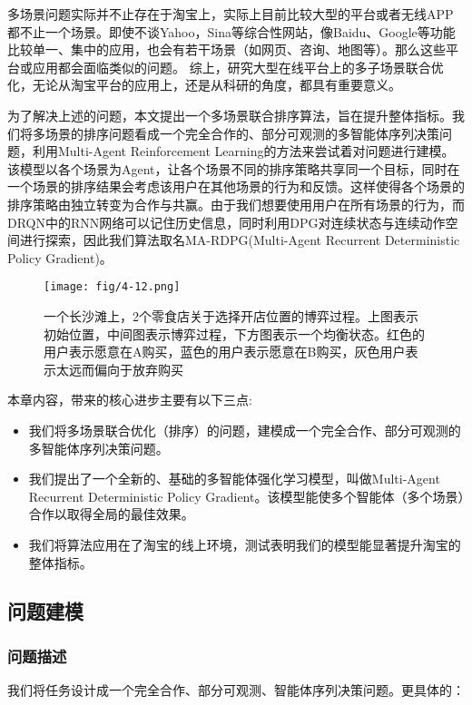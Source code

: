 多场景问题实际并不止存在于淘宝上，实际上目前比较大型的平台或者无线APP都不止一个场景。即使不谈Yahoo，Sina等综合性网站，像Baidu、Google等功能比较单一、集中的应用，也会有若干场景（如网页、咨询、地图等）。那么这些平台或应用都会面临类似的问题。
综上，研究大型在线平台上的多子场景联合优化，无论从淘宝平台的应用上，还是从科研的角度，都具有重要意义。

为了解决上述的问题，本文提出一个多场景联合排序算法，旨在提升整体指标。我们将多场景的排序问题看成一个完全合作的、部分可观测的多智能体序列决策问题，利用Multi-Agent Reinforcement Learning的方法来尝试着对问题进行建模。该模型以各个场景为Agent，让各个场景不同的排序策略共享同一个目标，同时在一个场景的排序结果会考虑该用户在其他场景的行为和反馈。这样使得各个场景的排序策略由独立转变为合作与共赢。由于我们想要使用用户在所有场景的行为，而DRQN中的RNN网络可以记住历史信息，同时利用DPG对连续状态与连续动作空间进行探索，因此我们算法取名MA-RDPG(Multi-Agent Recurrent Deterministic Policy Gradient)。

\begin{figure}[!h]
\centering
\texttt{[image: fig/4-12.png]}
\caption{ 一个长沙滩上，2个零食店关于选择开店位置的博弈过程。上图表示初始位置，中间图表示博弈过程，下方图表示一个均衡状态。红色的用户表示愿意在A购买，蓝色的用户表示愿意在B购买，灰色用户表示太远而偏向于放弃购买}
\end{figure}

本章内容，带来的核心进步主要有以下三点:
\begin{itemize}
    \item 我们将多场景联合优化（排序）的问题，建模成一个完全合作、部分可观测的多智能体序列决策问题。
    
    \item 我们提出了一个全新的、基础的多智能体强化学习模型，叫做Multi-Agent Recurrent Deterministic Policy Gradient。该模型能使多个智能体（多个场景）合作以取得全局的最佳效果。
    
    \item 我们将算法应用在了淘宝的线上环境，测试表明我们的模型能显著提升淘宝的整体指标。
\end{itemize}

\subsection{问题建模}

\subsubsection{问题描述}
我们将任务设计成一个完全合作、部分可观测、智能体序列决策问题。更具体的：

